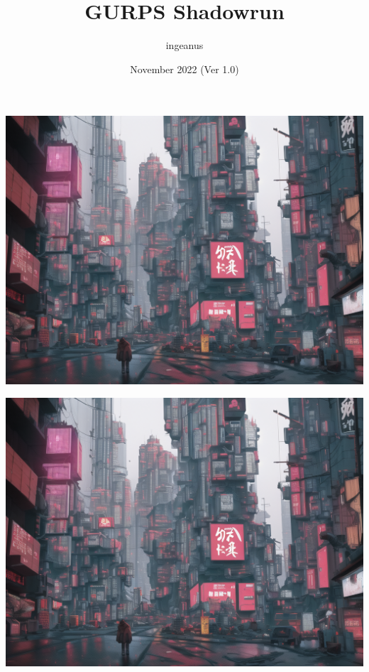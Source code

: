 \documentclass{article}
\title{GURPS Shadowrun}
\author{ingeanus}
\date{November 2022 (Ver 1.0)}
\begin{document}
	
	\maketitle
	
	\tableofcontents
	
	\newpage
	\includegraphics*[viewport = 0 0 512 768]{cover_image.png}
	
	\includegraphics*[viewport = 512 0 1024 768]{cover_image.png}
	
	
	
	\newpage
	
	
	\newpage
	
	
\end{document}
